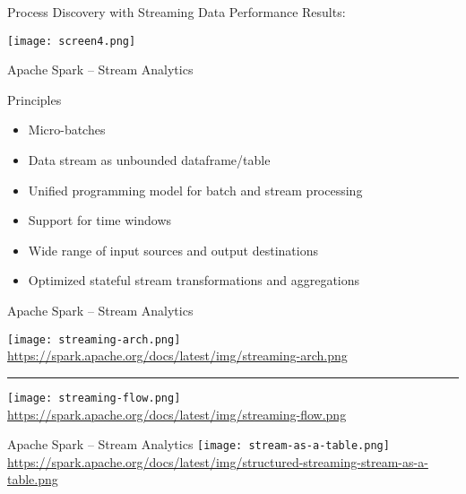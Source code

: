 \documentclass[ignorenonframetext,xcolor=x11names]{beamer}
\begin{document}
\begin{frame}{Process Discovery with Streaming Data}
Performance Results:
\begin{center}
\texttt{[image: screen4.png]}
\end{center}
\end{frame}

\begin{frame}{Apache Spark -- Stream Analytics}
\begin{block}{Principles}
\begin{itemize}
    \item Micro-batches
    \item Data stream as unbounded dataframe/table
    \item Unified programming model for batch and stream processing
    \item Support for time windows
    \item Wide range of input sources and output destinations
    \item Optimized stateful stream transformations and aggregations
\end{itemize}
\end{block}
\end{frame}

\begin{frame}{Apache Spark -- Stream Analytics}
\centering

\texttt{[image: streaming-arch.png]} \\
\scriptsize\url{https://spark.apache.org/docs/latest/img/streaming-arch.png}\normalsize \\

\vspace{\baselineskip}

\hrule

\vspace{\baselineskip}

\texttt{[image: streaming-flow.png]}  \\

\scriptsize\url{https://spark.apache.org/docs/latest/img/streaming-flow.png}
\end{frame}

\begin{frame}{Apache Spark -- Stream Analytics}
\texttt{[image: stream-as-a-table.png]} \\

\scriptsize\url{https://spark.apache.org/docs/latest/img/structured-streaming-stream-as-a-table.png}
\end{frame}
\end{document}
